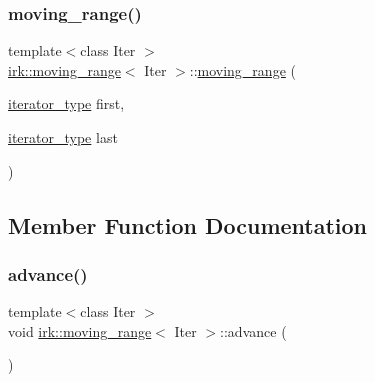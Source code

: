 \mbox{\label{structirk_1_1moving__range_a4db0c17a812a7562a87e749b7313a0c9}} 
\subsubsection{\texorpdfstring{moving\+\_\+range()}{moving\_range()}\hspace{0.1cm}{\footnotesize\ttfamily [2/2]}}
{\footnotesize\ttfamily template$<$class Iter $>$ \\
\mbox{\hyperlink{structirk_1_1moving__range}{irk\+::moving\+\_\+range}}$<$ Iter $>$\+::\mbox{\hyperlink{structirk_1_1moving__range}{moving\+\_\+range}} (\begin{DoxyParamCaption}\item[{\mbox{\hyperlink{structirk_1_1moving__range_ad77e99c581516edfaae4cdb3cc6793ba}{iterator\+\_\+type}}}]{first,  }\item[{\mbox{\hyperlink{structirk_1_1moving__range_ad77e99c581516edfaae4cdb3cc6793ba}{iterator\+\_\+type}}}]{last }\end{DoxyParamCaption})\hspace{0.3cm}{\ttfamily [inline]}}



\subsection{Member Function Documentation}
\mbox{\label{structirk_1_1moving__range_ae842c24ac2957ac1f68bd3d22e251e47}} 
\subsubsection{\texorpdfstring{advance()}{advance()}\hspace{0.1cm}{\footnotesize\ttfamily [1/2]}}
{\footnotesize\ttfamily template$<$class Iter $>$ \\
void \mbox{\hyperlink{structirk_1_1moving__range}{irk\+::moving\+\_\+range}}$<$ Iter $>$\+::advance (\begin{DoxyParamCaption}{ }\end{DoxyParamCaption})\hspace{0.3cm}{\ttfamily [inline]}}



